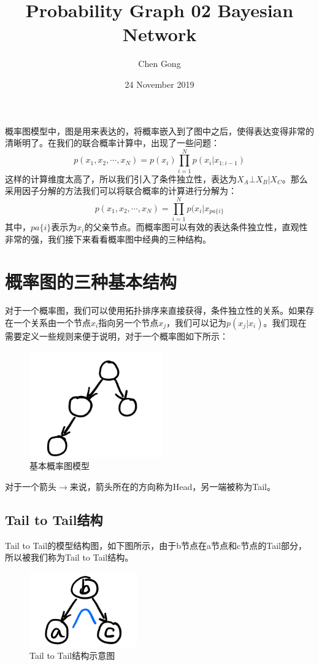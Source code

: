 \documentclass[a4paper]{article}
\title{Probability Graph 02 Bayesian Network}
\author{Chen Gong}
\date{24 November 2019}
\begin{document}
\maketitle

概率图模型中，图是用来表达的，将概率嵌入到了图中之后，使得表达变得非常的清晰明了。在我们的联合概率计算中，出现了一些问题：
\begin{equation}
    p(x_1,x_2,\cdots,x_N)=p(x_i)\prod_{i=1}^Np(x_i|x_{1:i-1})
\end{equation}
这样的计算维度太高了，所以我们引入了条件独立性，表达为$X_A\bot X_B | X_C$。那么采用因子分解的方法我们可以将联合概率的计算进行分解为：
\begin{equation}
    p(x_1,x_2,\cdots,x_N)=\prod_{i=1}^Np(x_i|x_{pa\{i\}}
\end{equation}
其中，$pa\{i\}$表示为$x_i$的父亲节点。而概率图可以有效的表达条件独立性，直观性非常的强，我们接下来看看概率图中经典的三种结构。


\section{概率图的三种基本结构}
对于一个概率图，我们可以使用拓扑排序来直接获得，条件独立性的关系。如果存在一个关系由一个节点$x_i$指向另一个节点$x_j$，我们可以记为$p(x_j|x_i)$。我们现在需要定义一些规则来便于说明，对于一个概率图如下所示：
\begin{figure}[H]
    \centering
    \includegraphics[width=.35\textwidth]{微信图片_20191124100458.png}
    \caption{基本概率图模型}
    \label{fig:my_label_1}
\end{figure}
对于一个箭头$\longrightarrow$来说，箭头所在的方向称为Head，另一端被称为Tail。

\subsection{Tail to Tail结构}
Tail to Tail的模型结构图，如下图所示，由于b节点在a节点和c节点的Tail部分，所以被我们称为Tail to Tail结构。
\begin{figure}[H]
    \centering
    \includegraphics[width=.35\textwidth]{微信图片_20191124101337.png}
    \caption{Tail to Tail结构示意图}
    \label{fig:my_label_1}
\end{figure}
\end{document}
